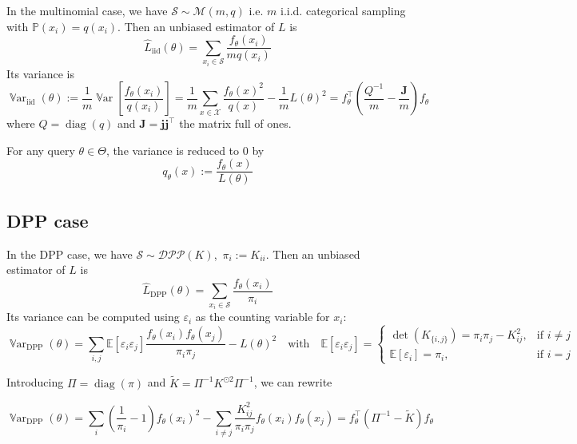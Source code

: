 \documentclass{article} %
\renewcommand{\epsilon}{\varepsilon}
\newcommand{\PP}{\mathbb{P}}
\newcommand{\EE}{\mathbb{E}}
\newcommand{\Var}{\operatorname{\mathbb V ar}}
\newcommand{\T}{^\top}  %
\newcommand{\1}{\mathds{1}} %
\newcommand{\voones}{\boldsymbol{j}} %
\newcommand{\moones}{\boldsymbol{J}} %
\theoremstyle{definition} %
\begin{document}
In the multinomial case, we have $\mathcal S \sim \mathcal M(m, q)$ i.e. $m$ i.i.d. categorical sampling with $\PP(x_i) = q(x_i)$.
Then an unbiased estimator of $L$ is
\begin{equation*}
	\hat L_{\textrm{iid}}(\theta) = \sum_{x_i\in \mathcal S} \frac{f_\theta(x_i)}{m q(x_i)}
\end{equation*}
Its variance is
\begin{equation}
	\Var_{\textrm{iid}}(\theta) :=\frac{1}{m} \Var\left[\frac {f_{\theta}(x_i)} {q(x_i)}\right] 
	=\frac{1}{m} \sum_{x \in \mathcal{X}} \frac{f_{\theta}(x)^{2}}{q(x)} -\frac{1}{m} L(\theta)^{2} = f_\theta\T(\frac{Q^{-1}} m - \frac{\moones} m)f_\theta
\end{equation}
where $Q = \operatorname{diag}(q)$ and $\moones = \voones \voones \T$ the matrix full of ones. 

For any query $\theta \in \Theta$, the variance is reduced to 0 by
$$
q_{\theta}(x):=\frac{ f_{\theta}(x)}{L(\theta)}
$$


\subsection{DPP case}
In the DPP case, we have $ \mathcal S \sim \mathcal{DPP}(K)$, \,$\pi_i := K_{ii}$. Then an unbiased estimator of $L$ is
\begin{equation*}
	\hat L_{\textrm{DPP}}(\theta) = \sum_{x_i\in \mathcal S} \frac{f_\theta(x_i)}{\pi_i}
\end{equation*}
Its variance can be computed using $\epsilon_i$ as the counting variable for $x_i$:
$$
\Var_{\textrm{DPP}}(\theta)
=\sum_{i, j}\EE\left[\epsilon_{i} \epsilon_{j}\right] \frac{f_\theta(x_{i}) f_\theta(x_{j})} {\pi_{i} \pi_{j}}  - L(\theta)^{2}
\quad \text{with} \quad
\EE\left[\epsilon_{i} \epsilon_{j}\right]=
\begin{cases}
	\det(K_{\{i, j\}})=\pi_{i} \pi_{j}-K_{ij}^{2}, & \text{if } i \neq j \\
	\EE\left[\epsilon_{i}\right]=\pi_{i},&\text{if } i = j
\end{cases}
$$



Introducing $\Pi = \operatorname{diag}(\pi)$ and $\tilde K = \Pi^{-1}K^{\odot 2} \Pi^{-1}$, we can rewrite  

\begin{equation}
	\Var_{\textrm{DPP}}(\theta)=\sum_{i}\left(\frac{1}{\pi_{i}}-1\right) f_\theta(x_{i})^{2}-\sum_{i \neq j} \frac{K_{ij}^{2}}{\pi_{i} \pi_{j}} f_\theta(x_{i}) f_\theta(x_{j}) =  f_\theta\T (\Pi^{-1}  - \tilde{K}) f_\theta 
\end{equation}
\end{document}
